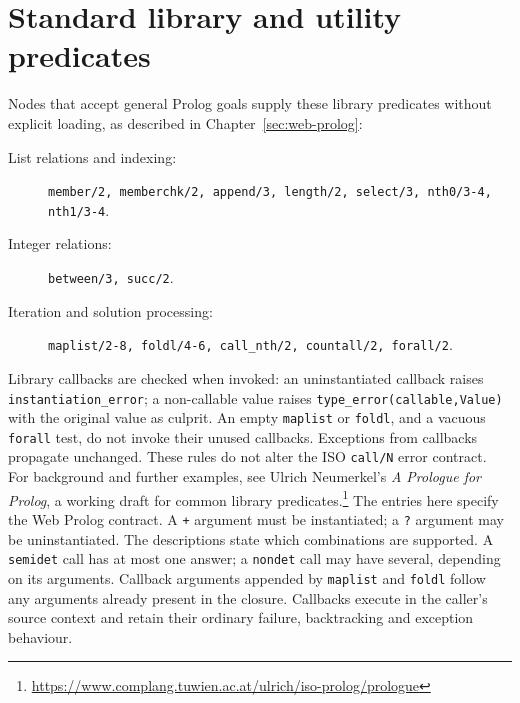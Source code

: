 \section{Standard library and utility predicates}\label{sec:manual-standard-library}

Nodes that accept general Prolog goals supply these library predicates
without explicit loading, as described in Chapter~\ref{sec:web-prolog}:

\begin{description}
\item[List relations and indexing:]
\texttt{member/\allowbreak{}2,\allowbreak{} memberchk/\allowbreak{}2,\allowbreak{} append/\allowbreak{}3,\allowbreak{} length/\allowbreak{}2,\allowbreak{} select/\allowbreak{}3,\allowbreak{}
nth0/\allowbreak{}3-4,\allowbreak{} nth1/\allowbreak{}3-4}.
\item[Integer relations:]
\texttt{between/\allowbreak{}3,\allowbreak{} succ/\allowbreak{}2}.
\item[Iteration and solution processing:]
\texttt{maplist/\allowbreak{}2-8,\allowbreak{} foldl/\allowbreak{}4-6,\allowbreak{} call\_\allowbreak{}nth/\allowbreak{}2,\allowbreak{} countall/\allowbreak{}2,\allowbreak{} forall/\allowbreak{}2}.
\end{description}

\noindent Library callbacks are checked when invoked: an uninstantiated callback raises
\texttt{instantiation\_error}; a non-callable value raises
\texttt{type\_error(callable,\allowbreak{}Value)} with the original value as culprit.
An empty \texttt{maplist} or \texttt{foldl}, and a vacuous \texttt{forall} test,
do not invoke their unused callbacks. Exceptions from callbacks propagate unchanged.
These rules do not alter the ISO \texttt{call/N} error contract.\\

For background and further examples, see Ulrich Neumerkel's
\emph{A Prologue for Prolog}, a working draft for common library predicates.\footnote{\url{https://www.complang.tuwien.ac.at/ulrich/iso-prolog/prologue}}
The entries here specify the Web Prolog contract. A \texttt{+} argument must be
instantiated; a \texttt{?} argument may be uninstantiated. The descriptions
state which combinations are supported. A \texttt{semidet} call has at most
one answer; a \texttt{nondet} call may have several, depending on its arguments.
Callback arguments appended by \texttt{maplist} and \texttt{foldl} follow any
arguments already present in the closure. Callbacks execute in the caller's
source context and retain their ordinary failure, backtracking and exception
behaviour.

